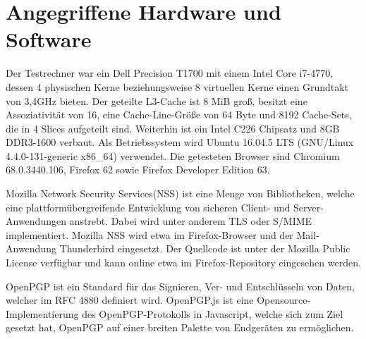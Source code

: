 \section{Angegriffene Hardware und Software}

Der Testrechner war ein Dell Precision T1700 mit einem Intel Core i7-4770, dessen 4 physischen Kerne beziehungsweise 8 virtuellen Kerne einen Grundtakt von 3,4GHz bieten.
Der geteilte L3-Cache ist 8 MiB groß, besitzt eine Assoziativität von 16, eine Cache-Line-Größe von 64 Byte und 8192 Cache-Sets, die in 4 Slices aufgeteilt sind.
Weiterhin ist ein Intel C226 Chipsatz und 8GB DDR3-1600 verbaut. 
Als Betriebssystem  wird Ubuntu 16.04.5 LTS (GNU/Linux 4.4.0-131-generic x86_64) verwendet. 
Die getesteten Browser sind Chromium 68.0.3440.106, Firefox 62 sowie Firefox Developer Edition 63.



Mozilla Network Security Services(NSS) \cite{MozillaNSS} ist eine Menge von Bibliotheken, welche eine plattformübergreifende Entwicklung von sicheren Client- und Server-Anwendungen anstrebt. Dabei wird unter anderem TLS oder S/MIME implementiert. Mozilla NSS wird etwa im Firefox-Browser und der Mail-Anwendung Thunderbird eingesetzt.
Der Quellcode ist unter der Mozilla Public License verfügbar und kann online etwa im Firefox-Repository \cite{MozillaDXR} eingesehen werden.

OpenPGP ist ein Standard für das Signieren, Ver- und Entschlüsseln von Daten, welcher im RFC 4880 \cite{rfc4880} definiert wird.
OpenPGP.js \cite{OpenPGPjs} ist eine Opensource-Implementierung des OpenPGP-Protokolls in Javascript, welche sich zum Ziel gesetzt hat, OpenPGP auf einer breiten Palette von Endgeräten zu ermöglichen.

